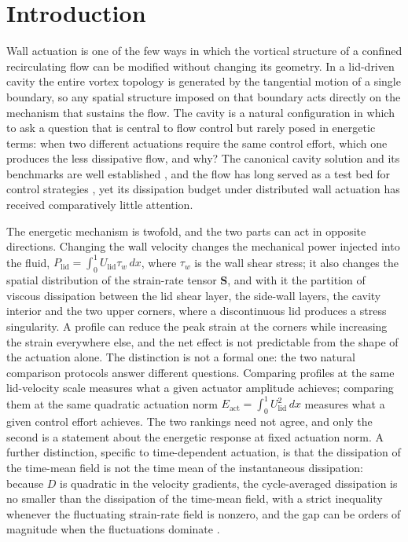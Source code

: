 \documentclass[11pt,a4paper]{article}
\newcommand{\Eact}{E_{\mathrm{act}}}
\newcommand{\Plid}{P_{\mathrm{lid}}}
\newcommand{\Sij}{\mathbf{S}}
\begin{document}
\section{Introduction}

Wall actuation is one of the few ways in which the vortical structure of a
confined recirculating flow can be modified without changing its geometry. In a
lid-driven cavity the entire vortex topology is generated by the tangential
motion of a single boundary, so any spatial structure imposed on that boundary
acts directly on the mechanism that sustains the flow. The cavity is a
natural configuration in which to ask a question that is central to flow control
but rarely posed in energetic terms: when two different actuations require the
same control effort, which one produces the less dissipative flow, and why?
The canonical cavity solution and its benchmarks are well established
\cite{ghia1982high,botella1998benchmark,shankardeshpande2000,albensoeder2005accurate,kuhlmann2019},
and the flow has long served as a test bed for control strategies
\cite{gadelhak2000,brunton2015closed,rowley2017model,bewley2001dns,bergmann2005optimal,choi1994active,quadrio2004critical,rabsult2019drl,garnier2021drl}, yet its dissipation budget under
distributed wall actuation has received comparatively little attention.

The energetic mechanism is twofold, and the two parts can act in opposite
directions. Changing the wall velocity changes the mechanical power injected into
the fluid,
$\Plid=\int_0^1 U_{\mathrm{lid}}\tau_w\,dx$, where $\tau_w$ is the wall shear
stress; it also changes the spatial distribution of the strain-rate tensor
$\Sij$, and with it the partition of viscous dissipation between the lid shear
layer, the side-wall layers, the cavity interior and the two upper corners, where
a discontinuous lid produces a stress singularity. A profile can reduce
the peak strain at the corners while increasing the strain everywhere else, and
the net effect is not predictable from the shape of the actuation alone. The
distinction is not a formal one: the two natural comparison protocols answer different
questions. Comparing profiles at the same lid-velocity scale
\cite{beniaiche2026} measures what a given actuator amplitude achieves; comparing
them at the same quadratic actuation norm
$\Eact=\int_0^1U_{\mathrm{lid}}^2\,dx$ measures what a given control effort
achieves. The two rankings need not agree, and only the second is a statement
about the energetic response at fixed actuation norm. A further distinction, specific to time-dependent actuation, is
that the dissipation of the time-mean field is not the time mean of the
instantaneous dissipation: because $D$ is quadratic in the velocity gradients, the
cycle-averaged dissipation is no smaller than the dissipation of the time-mean
field, with a strict inequality whenever the fluctuating strain-rate field is
nonzero, and
the gap can be orders of magnitude when the fluctuations dominate
\cite{pope2000,landau1987,doering2002energy,beneddine2016conditions}.
\end{document}
